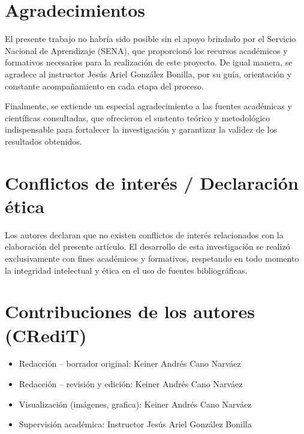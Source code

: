 \appendix

\section{Agradecimientos}

El presente trabajo no habría sido posible sin el apoyo brindado por el Servicio Nacional de Aprendizaje (SENA), que proporcionó los recursos académicos y formativos necesarios para la realización de este proyecto. De igual manera, se agradece al instructor Jesús Ariel González Bonilla, por su guía, orientación y constante acompañamiento en cada etapa del proceso.

Finalmente, se extiende un especial agradecimiento a las fuentes académicas y científicas consultadas, que ofrecieron el sustento teórico y metodológico indispensable para fortalecer la investigación y garantizar la validez de los resultados obtenidos.

\section{Conflictos de interés / Declaración ética}

Los autores declaran que no existen conflictos de interés relacionados con la elaboración del presente artículo. El desarrollo de esta investigación se realizó exclusivamente con fines académicos y formativos, respetando en todo momento la integridad intelectual y ética en el uso de fuentes bibliográficas.

\section{Contribuciones de los autores (CRediT)}

\begin{itemize}
\item Redacción – borrador original: Keiner Andrés Cano Narváez
\item Redacción – revisión y edición: Keiner Andrés Cano Narváez
\item Visualización (imágenes, grafica): Keiner Andrés Cano Narváez
\item Supervisión académica: Instructor Jesús Ariel González Bonilla
\end{itemize}